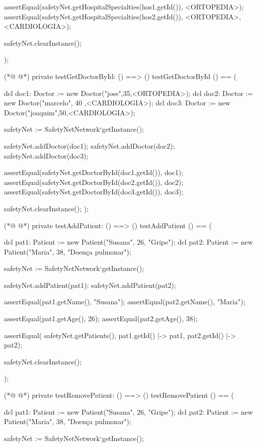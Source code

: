 \begin{vdmpp}[breaklines=true]
  assertEqual(safetyNet.getHospitalSpecialties(hos1.getId()), {<ORTOPEDIA>});
  assertEqual(safetyNet.getHospitalSpecialties(hos2.getId()), {<ORTOPEDIA>, <CARDIOLOGIA>});  
  
  safetyNet.clearInstance();
    
);

(*@
\label{testGetDoctorById:495}
@*)
private testGetDoctorById: () ==> ()
 testGetDoctorById () == (
   
  dcl doc1: Doctor := new Doctor("jose",35,<ORTOPEDIA>);
  dcl doc2: Doctor := new Doctor("marcelo", 40 ,<CARDIOLOGIA>);
  dcl doc3: Doctor := new Doctor("joaquim",50,<CARDIOLOGIA>);
  
  safetyNet := SafetyNetNetwork`getInstance();
   
  safetyNet.addDoctor(doc1);
  safetyNet.addDoctor(doc2);
  safetyNet.addDoctor(doc3);
  
  assertEqual(safetyNet.getDoctorById(doc1.getId()), doc1);
  assertEqual(safetyNet.getDoctorById(doc2.getId()), doc2);
  assertEqual(safetyNet.getDoctorById(doc3.getId()), doc3);
 
  safetyNet.clearInstance();
);

(*@
\label{testAddPatient:515}
@*)
private testAddPatient: () ==> ()
 testAddPatient () == (
 
  dcl pat1: Patient := new Patient("Susana", 26, "Gripe");
  dcl pat2: Patient := new Patient("Maria", 38, "Doença pulmonar");
   
  safetyNet := SafetyNetNetwork`getInstance();
   
  safetyNet.addPatient(pat1);
  safetyNet.addPatient(pat2);
  
  assertEqual(pat1.getName(), "Susana");
  assertEqual(pat2.getName(), "Maria");
  
  assertEqual(pat1.getAge(), 26);
  assertEqual(pat2.getAge(), 38); 

  assertEqual( safetyNet.getPatients(), {pat1.getId() |-> pat1, pat2.getId() |-> pat2});
  
  safetyNet.clearInstance();
    
);

(*@
\label{testRemovePatient:538}
@*)
private testRemovePatient: () ==> ()
 testRemovePatient () == (
 
  dcl pat1: Patient := new Patient("Susana", 26, "Gripe");
  dcl pat2: Patient := new Patient("Maria", 38, "Doença pulmonar");
   
  safetyNet := SafetyNetNetwork`getInstance();
   

\end{vdmpp}
